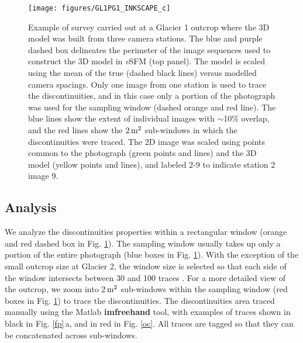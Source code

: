 \documentclass[draft,linenumbers]{agujournal}
\begin{document}
\begin{figure}[H]
  \centering
  \texttt{[image: figures/GL1PG1\_INKSCAPE\_c]}
  \caption[]{Example of survey carried out at a Glacier 1 outcrop where the 3D model was built from three camera stations. The blue and purple dashed box delineates the perimeter of the image sequences used to construct the 3D model in \emph{v}SFM (top panel). The model is scaled using the mean of the true (dashed black lines) versus modelled camera spacings. Only one image from one station is used to trace the discontinuities, and in this case only a portion of the photograph was used for the sampling window (dashed orange and red line). The blue lines show the extent of individual images with $\sim$10\% overlap, and the red lines show the $\rm 2\,m^2$ sub-windows in which the discontinuities were traced. The 2D image was scaled using points common to the photograph (green points and lines) and the 3D model (yellow points and lines), and labeled 2-9 to indicate station 2 image 9.}
\label{pg}
\end{figure}

\subsection{Analysis}

We analyze the discontinuities properties within a rectangular window (orange and red dashed box in Fig. \ref{pg}). The sampling window usually takes up only a portion of the entire photograph (blue boxes in Fig. \ref{pg}). With the exception of the small outcrop size at Glacier 2, the window size is selected so that each side of the window intersects between 30 and 100 traces \citep{Priest2012}. For a more detailed view of the outcrop, we zoom into 2\,$\rm m^{2}$ sub-windows within the sampling window (red boxes in Fig. \ref{pg}) to trace the discontinuities. The discontinuities area traced manually using the Matlab \textbf{imfreehand} tool, with examples of traces shown in black in Fig. \ref{fp}\,a, and in red in Fig. \ref{oc}. 
All traces are tagged so that they can be concatenated across sub-windows.
\end{document}
